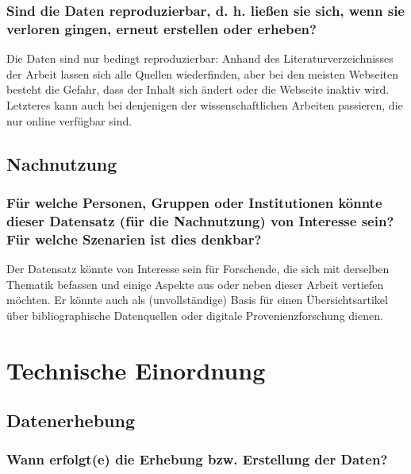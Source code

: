 \documentclass[%
  11pt,
  DIV=16,
  a4paper,
  BCOR=15mm,
  twoside=on,
  bibliography=totoc,
  headings=normal,
  numbers=noendperiod,
]{scrartcl}
\begin{document}
\subsubsection{Sind die Daten reproduzierbar, d. h. ließen sie sich, wenn sie verloren gingen, erneut erstellen oder erheben?}

Die Daten sind nur bedingt reproduzierbar:
Anhand des Literaturverzeichnisses der Arbeit lassen sich alle Quellen wiederfinden,
aber bei den meisten Webseiten besteht die Gefahr, dass der Inhalt sich ändert oder
die Webseite inaktiv wird. Letzteres kann auch bei denjenigen der wissenschaftlichen
Arbeiten passieren, die nur online verfügbar sind.

\subsection{Nachnutzung}

\subsubsection{Für welche Personen, Gruppen oder Institutionen könnte dieser Datensatz (für die Nachnutzung) von Interesse sein? Für welche Szenarien ist dies denkbar?}

Der Datensatz könnte von Interesse sein für Forschende, die sich mit derselben Thematik befassen
und einige Aspekte aus oder neben dieser Arbeit vertiefen möchten.
Er könnte auch als (unvollständige) Basis für einen Übersichtsartikel über bibliographische Datenquellen
oder digitale Provenienzforschung dienen.

\section{Technische Einordnung}

\subsection{Datenerhebung}

\subsubsection{Wann erfolgt(e) die Erhebung bzw. Erstellung der Daten?}
\end{document}
